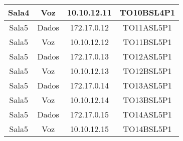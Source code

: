 \begin{table}[]
\begin{tabular}{cccc}
		Sala4          & Voz              & 10.10.12.11 & TO10BSL4P1          \\ \hline
		Sala5          & Dados            & 172.17.0.12 & TO11ASL5P1           \\ \hline
		Sala5          & Voz              & 10.10.12.12 & TO11BSL5P1           \\ \hline
		Sala5          & Dados            & 172.17.0.13 & TO12ASL5P1           \\ \hline
		Sala5          & Voz              & 10.10.12.13 & TO12BSL5P1           \\ \hline
		Sala5          & Dados            & 172.17.0.14 & TO13ASL5P1           \\ \hline
		Sala5          & Voz              & 10.10.12.14 & TO13BSL5P1           \\ \hline
		Sala5          & Dados            & 172.17.0.15 & TO14ASL5P1           \\ \hline
		Sala5          & Voz              & 10.10.12.15 & TO14BSL5P1           \\ \hline
	\end{tabular}
\end{table}